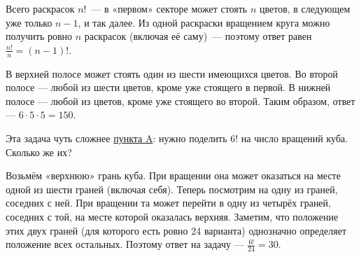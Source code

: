 \begin{itemize}
\itA \label{mgap-ba} Всего раскрасок $n!$~— в «первом» секторе может стоять $n$ цветов, в следующем уже только $n-1$, и так далее. Из одной раскраски вращением круга можно получить ровно $n$ раскрасок (включая её саму)~— поэтому ответ равен $\tfrac{n!}{n} = (n-1)!$.

\itB В верхней полосе может стоять один из шести имеющихся цветов. Во второй полосе — любой из шести цветов, кроме уже стоящего в первой. В нижней полосе — любой из цветов, кроме уже стоящего во второй. Таким образом, ответ — $6 \cdot 5 \cdot 5 = 150$.

\itC Эта задача чуть сложнее \hyperref[mgap-ba]{пункта A}: нужно поделить $6!$ на число вращений куба. Сколько же их?

\ms Возьмём «верхнюю» грань куба. При вращении она может оказаться на месте одной из шести граней (включая себя). Теперь посмотрим на одну из граней, соседних с ней. При вращении та может перейти в одну из четырёх граней, соседних с той, на месте которой оказалась верхняя. Заметим, что положение этих двух граней (для которого есть ровно 24 варианта) однозначно определяет положение всех остальных. Поэтому ответ на задачу — $\tfrac{6!}{24} = 30$.
\end{itemize}